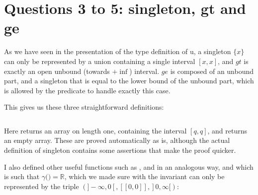 \section{Questions 3 to 5: singleton, gt and ge}

As we have seen in the presentation of the type definition of u, a singleton $\{x\}$
can only be represented by a union containing a single interval $[x,x]$, and $gt$ is
exactly an open unbound (towards $+\inf$) interval.
%
$ge$ is composed of an unbound
part, and a singleton that is equal to the lower bound of the unbound part, which is
allowed by the  predicate to handle exactly this case.

This gives us these three straightforward definitions:
\inputminted{\whyml}{why3code/simple_ones.mlw}

Here  returns an array on length one, containing the
interval $[q,q]$, and  returns an empty array. These are
proved automatically as is, although the actual definition of singleton contains some
assertions that make the proof quicker.

I also defined other useful functions such as ,  and
 in an analogous way, and  which is such that
$\gamma($$) = \mathbb{R}$, which we made sure with the invariant can
only be represented by the triple $(]-\infty, 0[, [[0,0]], ]0,\infty[)$:
\inputminted{\whyml}{why3code/simple_all.mlw}

